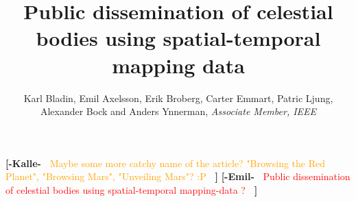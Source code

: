 \documentclass[journal]{vgtc}                %
\title{Public dissemination of celestial bodies using spatial-temporal mapping data}
\author{Karl Bladin, Emil Axelsson, Erik Broberg, Carter Emmart, Patric Ljung, \\ Alexander Bock and Anders Ynnerman, \textit{Associate Member, IEEE}}
\newcommand{\kallecomment}[1]{\textbf{[-Kalle-~}
    \textcolor{orange}{#1}
    \textbf{~]}}
\newcommand{\emilcomment}[1]{\textbf{[-Emil-~}
    \textcolor{red}{#1}
    \textbf{~]}}
\begin{document}

 \label{sec:introduction}
\maketitle
\kallecomment{Maybe some more catchy name of the article? "Browsing the Red Planet", "Browsing Mars", "Unveiling Mars"? :P}
\emilcomment{Public dissemination of celestial bodies using spatial-temporal mapping-data ?}
\end{document}
